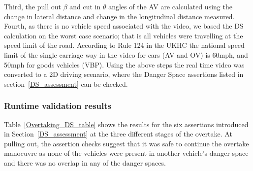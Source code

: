 %
Third, the pull out $\beta$ and cut in $\theta$ angles of the AV are calculated using the change in lateral distance and change in the longitudinal distance measured. Fourth, as there is no vehicle speed associated with the video, we based the DS calculation on the worst case scenario; that is all vehicles were travelling at the speed limit of the road. 
%
According to Rule 124 in the UKHC the national speed limit of the single carriage way in the video for cars (AV and OV) is 60mph, and 50mph for goods vehicles (VBP). Using the above steps the real time video was converted to a 2D driving scenario, where the Danger Space assertions listed in section~\ref{DS_assessment} can be checked.

\subsubsection{Runtime validation results}
Table~\ref{Overtaking_DS_table} shows the results for the six assertions introduced in Section~\ref{DS_assessment} at the three different stages of the overtake. At pulling out, the assertion checks suggest that it was safe to continue the overtake manoeuvre as none of the vehicles were present in another vehicle's danger space and there was no overlap in any of the danger spaces. 

